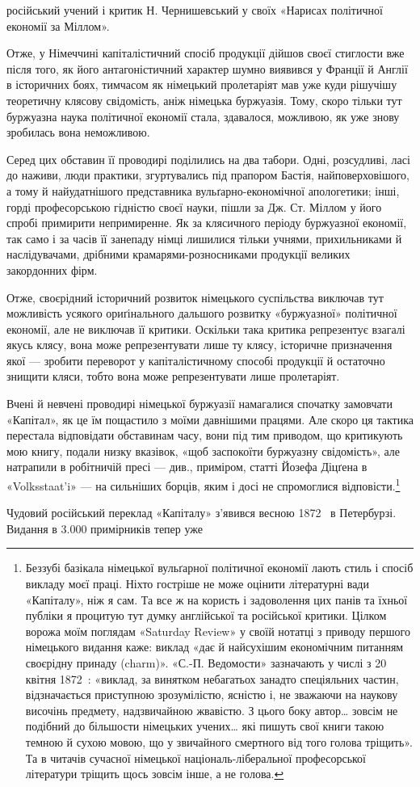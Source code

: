 \parcont{}  %
російський учений і критик Н. Чернишевський у своїх «Нарисах
політичної економії за Міллом».

Отже, у Німеччині капіталістичний спосіб продукції дійшов
своєї стиглости вже після того, як його антагоністичний характер
шумно виявився у Франції й Англії в історичних боях, тимчасом
як німецький пролетаріят мав уже куди рішучішу теоретичну
клясову свідомість, аніж німецька буржуазія. Тому, скоро тільки
тут буржуазна наука політичної економії стала, здавалося, можливою,
як уже знову зробилась вона неможливою.

Серед цих обставин її проводирі поділились на два табори.
Одні, розсудливі, ласі до наживи, люди практики, згуртувались
під прапором Бастія, найповерховішого, а тому й найудатнішого
представника вульґарно-економічної апологетики; інші, горді
професорською гідністю своєї науки, пішли за Дж. Ст. Міллом у
його спробі примирити непримиренне. Як за клясичного періоду
буржуазної економії, так само і за часів її занепаду німці лишилися
тільки учнями, прихильниками й наслідувачами, дрібними
крамарями-розносниками продукції великих закордонних фірм.

Отже, своєрідний історичний розвиток німецького суспільства
виключав тут можливість усякого ориґінального дальшого розвитку
«буржуазної» політичної економії, але не виключав її
критики. Оскільки така критика репрезентує взагалі якусь клясу,
вона може репрезентувати лише ту клясу, історичне призначення
якої — зробити переворот у капіталістичному способі продукції
й остаточно знищити кляси, тобто вона може репрезентувати лише
пролетаріят.

Вчені й невчені проводирі німецької буржуазії намагалися
спочатку замовчати «Капітал», як це їм пощастило з моїми давнішими
працями. Але скоро ця тактика перестала відповідати
обставинам часу, вони під тим приводом, що критикують мою
книгу, подали низку вказівок, «щоб заспокоїти буржуазну свідомість»,
але натрапили в робітничій пресі — див., приміром,
статті Йозефа Діцґена в «Volksstaat’i» — на сильніших борців,
яким і досі не спромоглися відповісти.\footnote{
Беззубі базікала німецької вульґарної політичної економії лають
стиль і спосіб викладу моєї праці. Ніхто гостріше не може оцінити літературні
вади «Капіталу», ніж я сам. Та все ж на користь і задоволення
цих панів та їхньої публіки я процитую тут думку англійської та російської
критики. Цілком ворожа моїм поглядам «Saturday Review» у своїй
нотатці з приводу першого німецького видання каже: виклад «дає й
найсухішим економічним питанням своєрідну принаду (charm)». «С.-П.
Ведомости» зазначають у числі з 20 квітня 1872~: «виклад, за винятком
небагатьох занадто спеціяльних частин, відзначається приступною зрозумілістю,
ясністю і, не зважаючи на наукову височінь предмету, надзвичайною
жвавістю. З цього боку автор\dots{} зовсім не подібний до більшости
німецьких учених\dots{} які пишуть свої книги такою темною й сухою мовою,
що у звичайного смертного від того голова тріщить». Та в читачів сучасної
німецької національ-ліберальної професорської літератури тріщить
щось зовсім інше, а не голова.
}

Чудовий російський переклад «Капіталу» з’явився весною
1872~ в Петербурзі. Видання в \num{3.000} примірників тепер уже
\parbreak{}  %

